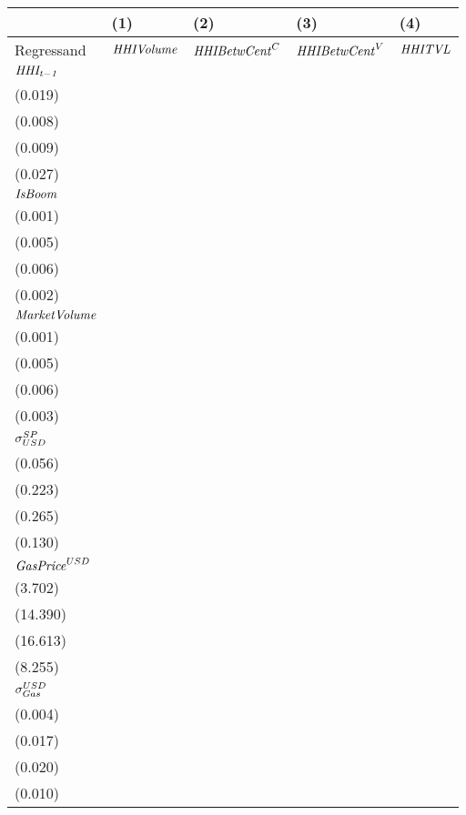 \begin{tabular}{lllll}
\toprule
{} &                                   (1) &                                  (2) &                                  (3) &                                    (4) \\
\midrule
Regressand                 &                     ${\it HHIVolume}$ &                ${\it HHIBetwCent}^C$ &                ${\it HHIBetwCent}^V$ &                         ${\it HHITVL}$ \\
$\it HHI_{t-1}$            &   \makecell{$0.798^{***}$ \\ (0.019)} &  \makecell{$0.962^{***}$ \\ (0.008)} &  \makecell{$0.957^{***}$ \\ (0.009)} &    \makecell{$0.546^{***}$ \\ (0.027)} \\
${\it IsBoom}$             &  \makecell{$-0.004^{***}$ \\ (0.001)} &  \makecell{$0.013^{***}$ \\ (0.005)} &  \makecell{$0.017^{***}$ \\ (0.006)} &    \makecell{$0.009^{***}$ \\ (0.002)} \\
${\it MarketVolume}$       &    \makecell{$-0.002^{*}$ \\ (0.001)} &     \makecell{$0.000^{}$ \\ (0.005)} &    \makecell{$-0.001^{}$ \\ (0.006)} &     \makecell{$-0.005^{*}$ \\ (0.003)} \\
${\it \sigma}^{SP}_{USD}$  &     \makecell{$-0.010^{}$ \\ (0.056)} &    \makecell{$-0.134^{}$ \\ (0.223)} &    \makecell{$-0.150^{}$ \\ (0.265)} &   \makecell{$-0.546^{***}$ \\ (0.130)} \\
${\it GasPrice}^{USD}$     &     \makecell{$-3.508^{}$ \\ (3.702)} &   \makecell{$13.792^{}$ \\ (14.390)} &    \makecell{$5.810^{}$ \\ (16.613)} &  \makecell{$-23.044^{***}$ \\ (8.255)} \\
${\it \sigma}_{Gas}^{USD}$ &   \makecell{$-0.011^{**}$ \\ (0.004)} &     \makecell{$0.006^{}$ \\ (0.017)} &     \makecell{$0.005^{}$ \\ (0.020)} &       \makecell{$0.002^{}$ \\ (0.010)} \\

\end{tabular}
